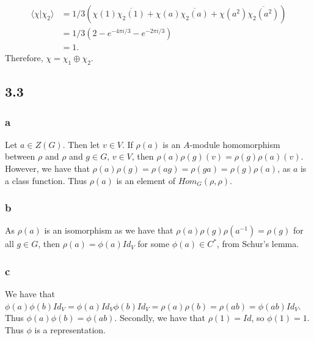 \documentclass[]{article}
\begin{document}
\begin{align*}
	\langle \chi | \chi_2 \rangle &= 1/3 \left( \chi(1)\overline{\chi_2(1)} +   \chi(a)\overline{\chi_2(a)} + \chi(a^2)\overline{\chi_2(a^2)}   \right) \\
	&= 1/3(2 -e^{-4 \pi i/3} -  e^{-2 \pi i/3}) \\
	&= 1.
\end{align*}
Therefore, $\chi = \chi_1 \oplus \chi_2$.

\subsection*{3.3}
\subsubsection*{a}
Let $a \in Z(G)$. Then let $v \in V$. If $\rho(a)$ is an $A$-module homomorphism between $\rho$ and $\rho$ and $g \in G$, $v \in V$, then $\rho(a) \rho(g)(v) = \rho(g) \rho(a) (v)$. However, we have that $\rho(a) \rho(g) = \rho(ag) = \rho(ga) = \rho(g) \rho(a)$, as $a$ is a class function. Thus $\rho(a)$ is an element of $Hom_G(\rho, \rho)$.

\subsubsection*{b}
As $\rho(a)$ is an isomorphism as we have that $\rho(a) \rho(g) \rho(a^{-1}) = \rho(g)$ for all $g \in G$, then $\rho(a) = \phi(a) Id_V$ for some $\phi(a) \in C^*$, from Schur's lemma. 
\subsubsection*{c}
We have that $\phi(a) \phi(b) Id_V = \phi(a) Id_V \phi(b) Id_V = \rho(a) \rho(b) = \rho(ab) = \phi(ab) Id_V$. Thus $\phi(a) \phi(b) = \phi(ab)$. Secondly, we have that $\rho(1) = Id$, so $\phi(1) = 1$. Thus $\phi$ is a representation. 

\end{document}

